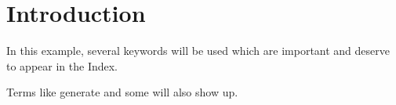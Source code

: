 \documentclass{article}
\begin{document}
	\section{Introduction}
	In this example, several keywords will be used 
	which are important and deserve to appear in the Index.
	
	Terms like generate and some will 
	also show up. 
	
	\printindex
\end{document}
